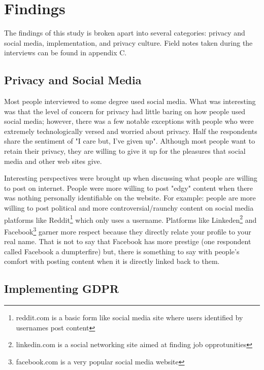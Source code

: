 \documentclass[12pt,
 reprint,
nofootinbib,
 amsmath,amssymb,
 aps,
]{revtex4-2}
\begin{document}
\section{\label{sec:level1}Findings}

The findings of this study is broken apart into several categories: privacy and social media, implementation, and privacy culture.
Field notes taken during the interviews can be found in appendix C.

\subsection{\label{sec:level2}Privacy and Social Media}

Most people interviewed to some degree used social media.
What was interesting was that the level of concern for privacy had little baring on how people used social media; however, there was a few notable exceptions with people who were extremely technologically versed and worried about privacy. 
Half the respondents share the sentiment of "I care but, I've given up".
Although most people want to retain their privacy, they are willing to give it up for the pleasures that social media and other web sites give.

Interesting perspectives were brought up when discussing what people are willing to post on internet.
People were more willing to post "edgy" content when there was nothing personally identifiable on the website. For example: people are more willing to post political and more controversial/raunchy content on social media platforms like Reddit\footnote{reddit.com is a basic form like social media site where users identified by usernames post content} which only uses a username. 
Platforms like Linkeden\footnote{linkedin.com is a social networking site aimed at finding job opprotunities} and Facebook\footnote{facebook.com is a very popular social media website} garner more respect because they directly relate your profile to your real name. 
That is not to say that Facebook has more prestige (one respondent called Facebook a dumpterfire) but, there is something to say with people's comfort with posting content when it is directly linked back to them. 


\subsection{\label{sec:level2}Implementing GDPR}
\end{document}
